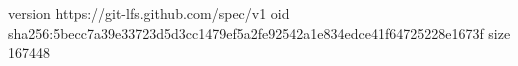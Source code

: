 version https://git-lfs.github.com/spec/v1
oid sha256:5becc7a39e33723d5d3cc1479ef5a2fe92542a1e834edce41f64725228e1673f
size 167448
